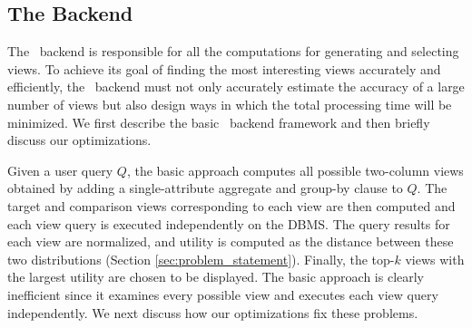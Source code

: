 \subsection{The Backend}
\label{subsec:seedb_backend}

The \SeeDB\ backend is responsible for all the computations for 
generating and selecting views. 
To achieve its goal of finding the most
interesting views accurately and efficiently, the \SeeDB\ backend must not only accurately
estimate the accuracy of a large number of views but also design ways in which
the total processing time will be minimized.
We first describe the basic \SeeDB\ backend framework and then briefly discuss our optimizations.


Given a user query $Q$, the basic approach computes all
possible two-column views obtained by adding a single-attribute aggregate and group-by clause to $Q$. 
The target and comparison views corresponding to each view are then
computed and each view query is executed independently on the DBMS. The query
results for each view are normalized, and utility is computed as the
distance between these two distributions (Section \ref{sec:problem_statement}).
Finally, the top-$k$ views with the largest utility are chosen to be displayed. 
The basic approach is clearly inefficient
since it examines every possible view 
and executes each view query independently.
We next discuss how our optimizations fix these problems.

